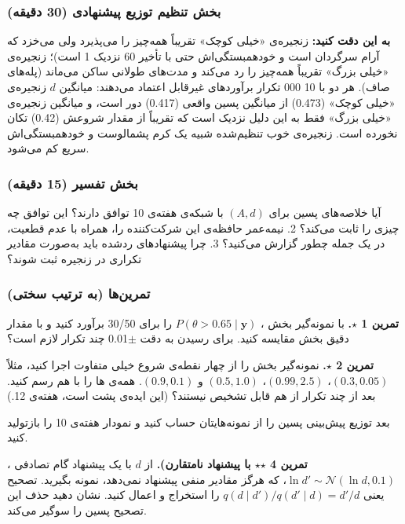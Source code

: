\subsubsection{\texorpdfstring{بخش  تنظیم توزیع پیشنهادی (30
دقیقه)}{بخش D: تنظیم توزیع پیشنهادی (30 دقیقه)}}

\textbf{به این دقت کنید:} زنجیره‌ی «خیلی کوچک» تقریباً همه‌چیز را می‌پذیرد
ولی می‌خزد  که آرام سرگردان است و خودهمبستگی‌اش حتی با تأخیر 60
نزدیک 1 است)؛ زنجیره‌ی «خیلی بزرگ» تقریباً همه‌چیز را رد می‌کند و مدت‌های
طولانی ساکن می‌ماند (پله‌های صاف). هر دو با 10 000 تکرار برآوردهای غیرقابل
اعتماد می‌دهند: میانگین \(d\) زنجیره‌ی «خیلی کوچک» (0.473) از میانگین پسین
واقعی (0.417) دور است، و میانگین زنجیره‌ی «خیلی بزرگ» فقط به این دلیل
نزدیک است که تقریباً از مقدار شروعش (0.42) تکان نخورده است. زنجیره‌ی خوب
تنظیم‌شده شبیه یک کرم پشمالوست و خودهمبستگی‌اش سریع کم می‌شود.

\subsubsection{\texorpdfstring{بخش  تفسیر (15
دقیقه)}{بخش E: تفسیر (15 دقیقه)}}

آیا خلاصه‌های پسین  برای \((A, d)\) با شبکه‌ی هفته‌ی 10
توافق دارند؟ این توافق چه چیزی را ثابت می‌کند؟ 2. نیمه‌عمر حافظه‌ی این
شرکت‌کننده را، همراه با عدم قطعیت، در یک جمله چطور گزارش می‌کنید؟ 3. چرا
پیشنهادهای ردشده باید به‌صورت مقادیر تکراری در زنجیره ثبت شوند؟

\subsubsection{تمرین‌ها (به ترتیب سختی)}

\textbf{تمرین 1 \ensuremath{\star}.} با نمونه‌گیر بخش ،
\(P(\theta > 0.65\mid\mathbf{y})\) را برای 30/50 برآورد کنید و با مقدار
دقیق بخش  مقایسه کنید. برای رسیدن به دقت \ensuremath{\pm}0.01 چند تکرار لازم است؟

\textbf{تمرین 2 \ensuremath{\star}.} نمونه‌گیر بخش  را از چهار نقطه‌ی شروع خیلی
متفاوت اجرا کنید، مثلاً \((0.3, 0.05)\)، \((0.99, 2.5)\)، \((0.5, 1.0)\)
و \((0.9, 0.1)\). همه‌ی ها را با هم رسم کنید. بعد از چند تکرار
از هم قابل تشخیص نیستند؟ (این ایده‌ی پشت  است، هفته‌ی 12.)

بعد توزیع پیش‌بینی پسین را از نمونه‌هایتان حساب کنید و نمودار 
هفته‌ی 10 را بازتولید کنید.

\textbf{تمرین 4 \ensuremath{\star}\ensuremath{\star}  با پیشنهاد نامتقارن).} از
\(d\) با یک پیشنهاد گام تصادفی \textbf{}،
\(\ln d' \sim \mathcal{N}(\ln d,\allowbreak 0.1)\)، که هرگز مقادیر منفی پیشنهاد
نمی‌دهد، نمونه بگیرید. تصحیح  یعنی
\(q(d\mid d')/q(d'\mid d) = d'/d\) را استخراج و اعمال کنید. نشان دهید
حذف این تصحیح پسین را سوگیر می‌کند.

